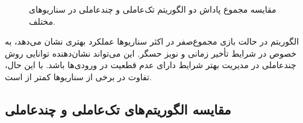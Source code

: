 \begin{figure}[H]
	\caption{مقایسه مجموع پاداش دو الگوریتم تک‌عاملی و چندعاملی  در سناریوهای مختلف. 
		}
	\label{fig:ppo_robustness_violin}
\end{figure}

الگوریتم  در حالت بازی مجموع‌صفر در اکثر سناریوها عملکرد بهتری نشان می‌دهد، به خصوص در شرایط تأخیر زمانی و نویز حسگر. این می‌تواند نشان‌دهنده توانایی روش چندعاملی در مدیریت بهتر شرایط دارای عدم قطعیت در ورودی‌ها باشد. با این حال، تفاوت در برخی از سناریوها کمتر از  است.

\subsection{مقایسه الگوریتم‌های تک‌عاملی و چندعاملی }

